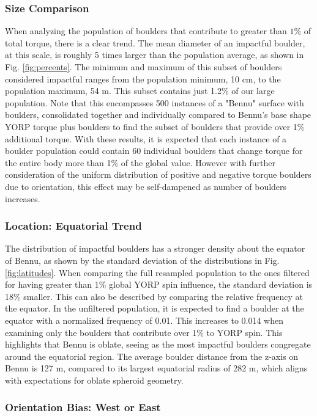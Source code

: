 \subsubsection{Size Comparison}
When analyzing the population of boulders that contribute to greater than $1\%$ of total torque, there is a clear trend. The mean diameter of an impactful boulder, at this scale, is roughly 5 times larger than the population average, as shown in Fig. \ref{fig:percents}. The minimum and maximum of this subset of boulders considered impactful ranges from the population minimum, 10 cm, to the population maximum, 54 m. This subset contains just 1.2\% of our large population. Note that this encompasses 500 instances of a "Bennu" surface with boulders, consolidated together and individually compared to Bennu's base shape YORP torque plus boulders to find the subset of boulders that provide over 1\% additional torque. With these results, it is expected that each instance of a boulder population could contain 60 individual boulders that change torque for the entire body more than 1\% of the global value. However with further consideration of the uniform distribution of positive and negative torque boulders due to orientation, this effect may be self-dampened as number of boulders increases. 


\subsubsection{Location: Equatorial Trend}
The distribution of impactful boulders has a stronger density about the equator of Bennu, as shown by the standard deviation of the distributions in Fig. \ref{fig:latitudes}. When comparing the full resampled population to the ones filtered for having greater than 1\% global YORP spin influence, the standard deviation is 18\% smaller. This can also be described by comparing the relative frequency at the equator. In the unfiltered population, it is expected to find a boulder at the equator with a normalized frequency of 0.01. This increases to 0.014 when examining only the boulders that contribute over 1\% to YORP spin. This highlights that Bennu is oblate, seeing as the most impactful boulders congregate around the equatorial region. The average boulder distance from the z-axis on Bennu is 127 m, compared to its largest equatorial radius of 282 m, which aligns with expectations for oblate spheroid geometry.


\subsubsection{Orientation Bias: West or East} 


